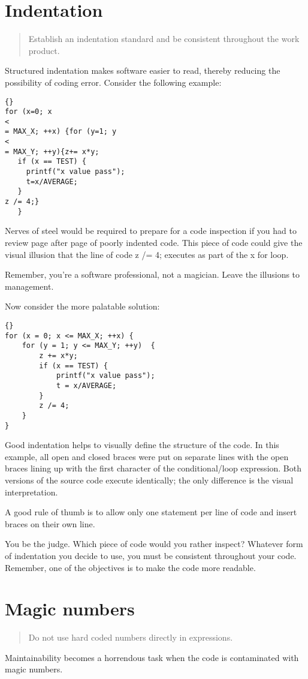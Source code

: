 \documentclass{report}
\begin{document}
\section{Indentation}
\begin{quote}
Establish an indentation standard and be consistent throughout the work product.
\end{quote}
Structured indentation makes software easier to read, thereby reducing the possibility of coding error. Consider the following example: 
\begin{lstlisting}{}
for (x=0; x 
<
= MAX_X; ++x) {for (y=1; y 
<
= MAX_Y; ++y){z+= x*y;
   if (x == TEST) {
     printf("x value pass");
     t=x/AVERAGE;
   }
z /= 4;}
   }
\end{lstlisting}
Nerves of steel would be required to prepare for a code inspection if you had to review page after page of poorly indented code. This piece of code could give the visual illusion that the line of code z /= 4; executes as part of the x for loop.

Remember, you're a software professional, not a magician. Leave the illusions to management.

Now consider the more palatable solution: 
\begin{lstlisting}{}
for (x = 0; x <= MAX_X; ++x) {
	for (y = 1; y <= MAX_Y; ++y)  {
		z += x*y;
		if (x == TEST) {
			printf("x value pass");
			t = x/AVERAGE;
		}
		z /= 4;
	}
}
\end{lstlisting}
Good indentation helps to visually define the structure of the code. In this example, all open and closed braces were put on separate lines with the open braces lining up with the first character of the conditional/loop expression. Both versions of the source code execute identically; the only difference is the visual interpretation.

A good rule of thumb is to allow only one statement per line of code and insert braces on their own line.

You be the judge. Which piece of code would you rather inspect? Whatever form of indentation you decide to use, you must be consistent throughout your code. Remember, one of the objectives is to make the code more readable. 

\section{Magic numbers}
\begin{quote}
Do not use hard coded numbers directly in expressions.
\end{quote}
Maintainability becomes a horrendous task when the code is contaminated with magic numbers.
\end{document}
